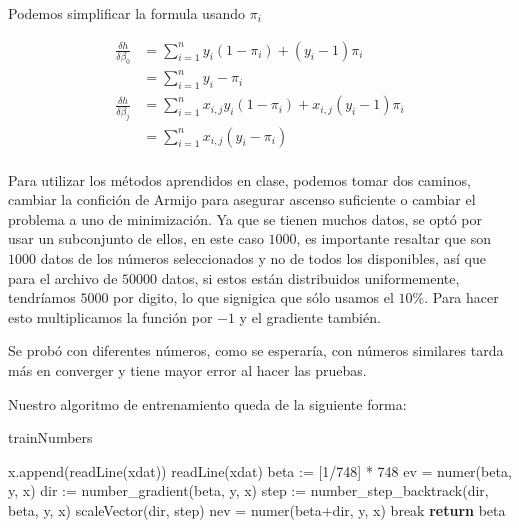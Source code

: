 \documentclass[10pt,twocolumn]{article}
\begin{document}
\begin{enumerate}
Podemos simplificar la formula usando $\pi_i$

\begin{align*} 
\frac{\delta h}{\delta\beta_0} &= \sum_{i=1}^{n}y_i(1 - \pi_i) + (y_i - 1)\pi_i\\
&= \sum_{i=1}^{n}y_i- \pi_i\\
\frac{\delta h}{\delta\beta_j} &= \sum_{i=1}^{n}x_{i, j}y_i(1 - \pi_i) + x_{i, j}(y_i - 1)\pi_i\\
&= \sum_{i=1}^{n}x_{i,j}(y_i- \pi_i)\\
\end{align*}

Para utilizar los métodos aprendidos en clase, podemos tomar dos caminos, cambiar la confición de Armijo para asegurar ascenso suficiente o cambiar el problema a uno de minimización. Ya que se tienen muchos datos, se optó por usar un subconjunto de ellos, en este caso $1000$, es importante resaltar que son $1000$ datos de los números seleccionados y no de todos los disponibles, así que para el archivo de $50000$ datos, si estos están distribuidos uniformemente, tendríamos $5000$ por digito, lo que signigica que sólo usamos el $10\%$. Para hacer esto multiplicamos la función por $-1$ y el gradiente también. 

Se probó con diferentes números, como se esperaría, con números similares tarda más en converger y tiene mayor error al hacer las pruebas.

\begin{table}[h]
\centering
\label{nums}
\end{table}

\newpage
Nuestro algoritmo de entrenamiento queda de la siguiente forma:

\begin{algorithm}[H]
\caption{trainNumbers}\label{train}
\begin{algorithmic}[1]
      \State x.append(readLine(xdat))
    \Else
      \State readLine(xdat) 
    \EndIf
  \EndFor
  \State beta := [1/748] * 748 
  \State ev = numer(beta, y, x)
    \State dir := number\_gradient(beta, y, x)
    \State step := number\_step\_backtrack(dir, beta, y, x)
    \State scaleVector(dir, step)
    \State nev = numer(beta+dir, y, x)
      \State break
    \EndIf
  \EndFor
  \State \textbf{return} beta
\EndFunction
\end{algorithmic}
\end{algorithm}

\end{enumerate}
\end{document}
